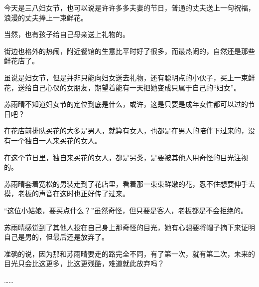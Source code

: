 今天是三八妇女节，也可以说是许许多多夫妻的节日，普通的丈夫送上一句祝福，浪漫的丈夫捧上一束鲜花。

当然，也有孩子给自己母亲送上礼物的。

街边也格外的热闹，附近餐馆的生意比平时好了很多，而最热闹的，自然还是那些鲜花店了。

虽说是妇女节，但是并非只能向妇女送去礼物，还有聪明点的小伙子，买上一束鲜花，送给自己心仪的女朋友，期望着能有一天把她变成只属于自己的“妇女”。

苏雨晴不知道妇女节的定位到底是什么，或许，这是只要是成年女性都可以过的节日吧？

在花店前排队买花的大多是男人，就算有女人，也都是在男人的陪伴下过来的，没有一个独自一人来买花的女人。

在这个节日里，独自来买花的女人，都是另类，是要被其他人用奇怪的目光注视的。

苏雨晴套着宽松的男装走到了花店里，看着那一束束鲜嫩的花，忍不住想要伸手去摸，老板的声音在这时也正好传了过来。

“这位小姑娘，要买点什么？”虽然奇怪，但只要是客人，老板都是不会拒绝的。

苏雨晴感觉到了其他人投在自己身上那奇怪的目光，她有心想要将帽子摘下来证明自己是男的，但最后还是放弃了。

准确的说，因为那和苏雨晴要走的路完全不同，有了第一次，就有第二次，未来的目光只会比这更多，比这更残酷，难道就此放弃吗？

……
